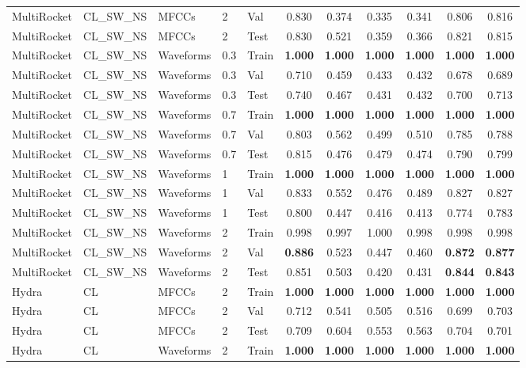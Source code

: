 \begin{landscape}
\begin{longtable}{|l|l|l|l|l|c|c|c|c|c|c|}
MultiRocket & CL\_SW\_NS & MFCCs & 2 & Val & 0.830 & 0.374 & 0.335 & 0.341 & 0.806 & 0.816 \\
MultiRocket & CL\_SW\_NS & MFCCs & 2 & Test & 0.830 & 0.521 & 0.359 & 0.366 & 0.821 & 0.815 \\
MultiRocket & CL\_SW\_NS & Waveforms & 0.3 & Train & \textbf{1.000} & \textbf{1.000} & \textbf{1.000} & \textbf{1.000} & \textbf{1.000} & \textbf{1.000} \\
MultiRocket & CL\_SW\_NS & Waveforms & 0.3 & Val & 0.710 & 0.459 & 0.433 & 0.432 & 0.678 & 0.689 \\
MultiRocket & CL\_SW\_NS & Waveforms & 0.3 & Test & 0.740 & 0.467 & 0.431 & 0.432 & 0.700 & 0.713 \\
MultiRocket & CL\_SW\_NS & Waveforms & 0.7 & Train & \textbf{1.000} & \textbf{1.000} & \textbf{1.000} & \textbf{1.000} & \textbf{1.000} & \textbf{1.000} \\
MultiRocket & CL\_SW\_NS & Waveforms & 0.7 & Val & 0.803 & 0.562 & 0.499 & 0.510 & 0.785 & 0.788 \\
MultiRocket & CL\_SW\_NS & Waveforms & 0.7 & Test & 0.815 & 0.476 & 0.479 & 0.474 & 0.790 & 0.799 \\
MultiRocket & CL\_SW\_NS & Waveforms & 1 & Train & \textbf{1.000} & \textbf{1.000} & \textbf{1.000} & \textbf{1.000} & \textbf{1.000} & \textbf{1.000} \\
MultiRocket & CL\_SW\_NS & Waveforms & 1 & Val & 0.833 & 0.552 & 0.476 & 0.489 & 0.827 & 0.827 \\
MultiRocket & CL\_SW\_NS & Waveforms & 1 & Test & 0.800 & 0.447 & 0.416 & 0.413 & 0.774 & 0.783 \\
MultiRocket & CL\_SW\_NS & Waveforms & 2 & Train & 0.998 & 0.997 & 1.000 & 0.998 & 0.998 & 0.998 \\
MultiRocket & CL\_SW\_NS & Waveforms & 2 & Val & \textbf{0.886} & 0.523 & 0.447 & 0.460 & \textbf{0.872} & \textbf{0.877} \\
MultiRocket & CL\_SW\_NS & Waveforms & 2 & Test & 0.851 & 0.503 & 0.420 & 0.431 & \textbf{0.844} & \textbf{0.843} \\
Hydra & CL & MFCCs & 2 & Train & \textbf{1.000} & \textbf{1.000} & \textbf{1.000} & \textbf{1.000} & \textbf{1.000} & \textbf{1.000} \\
Hydra & CL & MFCCs & 2 & Val & 0.712 & 0.541 & 0.505 & 0.516 & 0.699 & 0.703 \\
Hydra & CL & MFCCs & 2 & Test & 0.709 & 0.604 & 0.553 & 0.563 & 0.704 & 0.701 \\
Hydra & CL & Waveforms & 2 & Train & \textbf{1.000} & \textbf{1.000} & \textbf{1.000} & \textbf{1.000} & \textbf{1.000} & \textbf{1.000} \\

\end{longtable}
\end{landscape}
